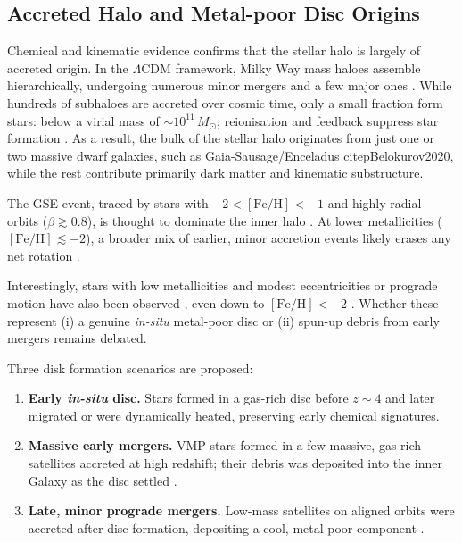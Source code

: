\documentclass[a4paper,12pt]{article}
\begin{document}
\subsection{Accreted Halo and Metal-poor Disc Origins}
\label{subsec:halo_disc_origins}

Chemical and kinematic evidence confirms that the stellar halo is largely of accreted origin. 
In the $\Lambda$CDM framework, Milky Way mass haloes assemble hierarchically, undergoing 
numerous minor mergers and a few major ones \citep{Springel2008}. 
While hundreds of subhaloes are accreted over cosmic time, only a small fraction form stars: 
below a virial mass of $\sim10^{11}\,M_\odot$, reionisation and feedback suppress star formation 
\citep{Purcell2007,BullockBoylanKolchin2017}. As a result, the bulk of the stellar halo originates 
from just one or two massive dwarf galaxies, such as Gaia-Sausage/Enceladus citep{Belokurov2020}, while the rest 
contribute primarily dark matter and kinematic substructure.

The GSE event, traced by stars with $-2 < [\mathrm{Fe/H}] < -1$ and highly radial orbits 
($\beta \gtrsim 0.8$), is thought to dominate the inner halo \citep{Belokurov2018,Helmi2018}. 
At lower metallicities ($[\mathrm{Fe/H}] \lesssim -2$), a broader mix of earlier, minor accretion 
events likely erases any net rotation \citep{Lancaster2019,Bird2021}.

Interestingly, stars with low metallicities and modest eccentricities or prograde motion 
have also been observed \citep{Norris1985,Chiba2000,Carollo2019,An2020}, even down to 
$[\mathrm{Fe/H}] < -2$ \citep{Sestito2019,Venn2020,Cordoni2020,Mardini2022}. 
Whether these represent (i) a genuine \textit{in-situ} metal-poor disc or 
(ii) spun-up debris from early mergers remains debated.

Three disk formation scenarios are proposed:
\begin{enumerate}
    \item \textbf{Early {\it in-situ} disc.}  
          Stars formed in a gas-rich disc before $z\sim4$ and later migrated or were dynamically heated, 
          preserving early chemical signatures.
    \item \textbf{Massive early mergers.}  
          VMP stars formed in a few massive, gas-rich satellites accreted at high redshift; 
          their debris was deposited into the inner Galaxy as the disc settled \citep[e.g.][]{Sestito2020}.
    \item \textbf{Late, minor prograde mergers.}  
          Low-mass satellites on aligned orbits were accreted after disc formation, 
          depositing a cool, metal-poor component \citep{Santistevan2021}.
\end{enumerate}
\end{document}

